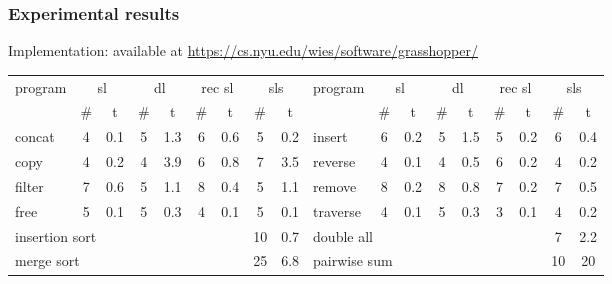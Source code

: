 \documentclass{beamer}
\begin{document}
\begin{frame}
  \frametitle{Experimental results}

Implementation: \Tool available at \url{https://cs.nyu.edu/wies/software/grasshopper/}

\begin{table}[t]%
{\tiny
\centering
\renewcommand{\tabcolsep}{0.14cm}
\begin{tabular}{|l|c|c|c|c|c|c|c|c||l|c|c|c|c|c|c|c|c|}
\hline
program & \multicolumn{2}{|c|}{sl} & \multicolumn{2}{|c|}{dl} & \multicolumn{2}{|c|}{rec sl} & \multicolumn{2}{|c||}{sls} & 

program & \multicolumn{2}{|c|}{sl}  & \multicolumn{2}{|c|}{dl} & \multicolumn{2}{|c|}{rec sl} & \multicolumn{2}{|c|}{sls}
\\

\cline{2-9}
\cline{11-18}

& \# & t & \# & t & \# & t & \# & t &
& \# & t & \# & t & \# & t & \# & t \\

\hline

concat & 4 & 0.1 & 5 & 1.3 & 6 & 0.6 & 5 & 0.2 & 
insert & 6 & 0.2 & 5 & 1.5 & 5 & 0.2 & 6 & 0.4 \\


copy    & 4 & 0.2 & 4 & 3.9 & 6 & 0.8 & 7 & 3.5 & 
reverse & 4 & 0.1 & 4 & 0.5 & 6 & 0.2 & 4 & 0.2 \\


filter & 7 & 0.6 & 5 & 1.1 & 8 & 0.4 & 5 & 1.1 & 
remove & 8 & 0.2 & 8 & 0.8 & 7 & 0.2 & 7 & 0.5 \\


free     & 5 & 0.1 & 5 & 0.3 & 4 & 0.1 & 5 & 0.1 & 
traverse & 4 & 0.1 & 5 & 0.3 & 3 & 0.1 & 4 & 0.2 \\

\cline{2-7}
\cline{11-16}


\multicolumn{7}{|l|}{insertion sort} & 10 & 0.7 &
\multicolumn{7}{|l|}{double all} & 7 & 2.2\\

\multicolumn{7}{|l|}{merge sort} & 25 & 6.8 &
\multicolumn{7}{|l|}{pairwise sum} & 10 & 20 \\
\hline
\end{tabular}
}
\end{table}


\end{frame}
\end{document}
